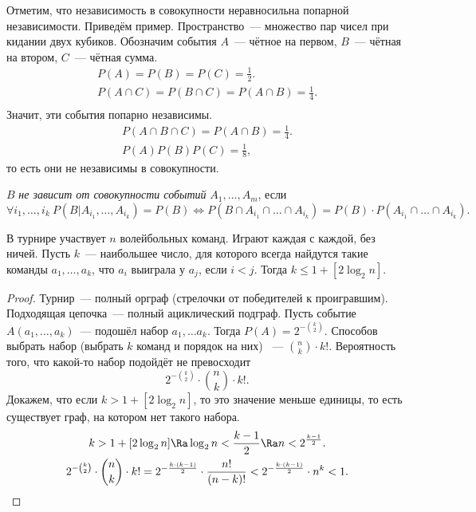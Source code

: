  
Отметим, что независимость в совокупности неравносильна попарной независимости.
Приведём пример. Пространство~--- множество пар чисел при кидании двух кубиков.
Обозначим события $A$~--- чётное на первом, $B$~--- чётная на втором, $C$~--- чётная сумма.
\begin{gather*}
P(A) = P(B) = P(C) = \frac{1}{2}.\\
P(A\cap C) = P(B \cap C) = P(A \cap B) = \frac{1}{4}.\\
\end{gather*}
Значит, эти события попарно независимы. 
\begin{gather*}
P(A \cap B \cap C) = P(A \cap B) = \frac{1}{4}.\\
P(A)P(B)P(C) = \frac{1}{8},
\end{gather*}
то есть они не независимы в совокупности. 

 \begin{definition}
     $B$ \textit{не зависит от совокупности событий} $A_1, \ldots, A_m$, если
     $$\forall{i_1, \ldots, i_k}\ P(B|A_{i_1},\ldots, A_{i_k})=P(B) \iff P(B \cap A_{i_1} \cap \ldots \cap A_{i_k}) = P(B)\cdot P(A_{i_1} \cap \ldots \cap A_{i_k}).$$
 \end{definition}

 \begin{theorem}
    В турнире участвует $n$ волейбольных команд. Играют каждая с каждой, без ничей. Пусть $k$~--- наибольшее число, для которого всегда найдутся такие команды $a_1,\ldots, a_k$, что $a_i$ выиграла у $a_j$, если $i < j$. Тогда $k \leq 1 + [2\log_2{n}]$.

 \end{theorem}
 \begin{proof}
     Турнир~--- полный орграф (стрелочки от победителей к проигравшим). Подходящая цепочка~--- полный ациклический подграф. Пусть событие
     $A(a_1, \ldots, a_k)$~--- подошёл набор $a_1, \ldots a_k$. Тогда
     $P(A) = 2^{- {\binom{k}{2}}}$.
     Способов выбрать набор (выбрать $k$ команд и порядок на них) ~--- ${\binom{n}{k}} \cdot k!$.
Вероятность того, что какой-то набор подойдёт не превосходит
     $$2^{-{\binom{k}{2}}}\cdot \binom{n}{k}\cdot k!.$$
     Докажем, что если $k > 1 + [2\log_2{n}]$, то это значение меньше единицы, то есть существует граф, на котором нет такого набора. 
     \begin{gather*}
         k > 1 + [2\log_2{n}] \Ra \log_2 n < \frac{k - 1}{2} \Ra n < 2^{\frac{k-1}{2}}.\\
     2^{-{\binom{k}{2}}}\cdot {\binom{n}{k}}\cdot k! = 2^{-\frac{k \cdot (k-1)}{2}}\cdot \frac{n!}{(n-k)!}< 2^{-\frac{k \cdot (k-1)}{2}}\cdot n^k < 1.
     \end{gather*}
 \end{proof}
